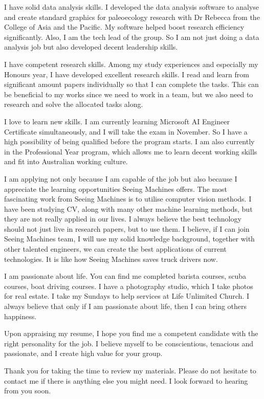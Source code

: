 \documentclass[11pt, a4paper]{awesome-cv}
\begin{document}
\begin{cvletter}
I have solid data analysis skills. I developed the data analysis software to analyse and create standard graphics for paleoecology research with Dr Rebecca from the College of Asia and the Pacific. My software helped boost research efficiency significantly. Also, I am the tech lead of the group. So I am not just doing a data analysis job but also developed decent leadership skills.

I have competent research skills. Among my study experiences and especially my Honours year, I have developed excellent research skills. I read and learn from significant amount papers individually so that I can complete the tasks. This can be beneficial to my works since we need to work in a team, but we also need to research and solve the allocated tasks along.

I love to learn new skills. I am currently learning Microsoft AI Engineer Certificate simultaneously, and I will take the exam in November. So I have a high possibility of being qualified before the program starts. I am also currently in the Professional Year program, which allows me to learn decent working skills and fit into Australian working culture.

I am applying not only because I am capable of the job but also because I appreciate the learning opportunities Seeing Machines offers. The most fascinating work from Seeing Machines is to utilise computer vision methods. I have been studying CV, along with many other machine learning methods, but they are not really applied in our lives. I always believe the best technology should not just live in research papers, but to use them. I believe, if I can join Seeing Machines team, I will use my solid knowledge background, together with other talented engineers, we can create the best applications of current technologies. It is like how Seeing Machines saves truck drivers now. 

I am passionate about life. You can find me completed barista courses, scuba courses, boat driving courses. I have a photography studio, which I take photos for real estate. I take my Sundays to help services at Life Unlimited Church. I always believe that only if I am passionate about life, then I can bring others happiness.

Upon appraising my resume, I hope you find me a competent candidate with the right personality for the job. I believe myself to be conscientious, tenacious and passionate, and I create high value for your group.

Thank you for taking the time to review my materials. Please do not hesitate to contact me if there is anything else you might need. I look forward to hearing from you soon.



\end{cvletter}
\end{document}
